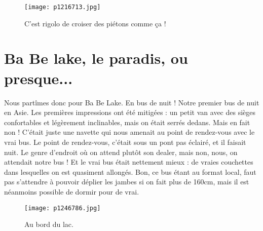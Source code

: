\documentclass{book}
\begin{document}
\begin{figure}[h]
\centering
\texttt{[image: p1216713.jpg]}
\caption*{C'est rigolo de croiser des piétons comme ça !}
\end{figure}



\chapter{Ba Be lake, le paradis, ou presque...}
Nous partîmes donc pour Ba Be Lake. En bus de nuit ! Notre premier bus de nuit en Asie. Les premières impressions ont été mitigées : un petit van avec des sièges confortables et légèrement inclinables, mais on était serrés dedans. Mais en fait non ! C'était juste une navette qui nous amenait au point de rendez-vous avec le vrai bus. Le point de rendez-vous, c'était sous un pont pas éclairé, et il faisait nuit. Le genre d'endroit où on attend plutôt son dealer, mais non, nous, on attendait notre bus ! Et le vrai bus était nettement mieux : de vraies couchettes dans lesquelles on est quasiment allongés. Bon, ce bus étant au format local, faut pas s'attendre à pouvoir déplier les jambes si on fait plus de 160cm, mais il est néanmoins possible de dormir pour de vrai.


\begin{figure}[h]
\centering
\texttt{[image: p1246786.jpg]}
\caption*{Au bord du lac.}
\end{figure}
\end{document}
